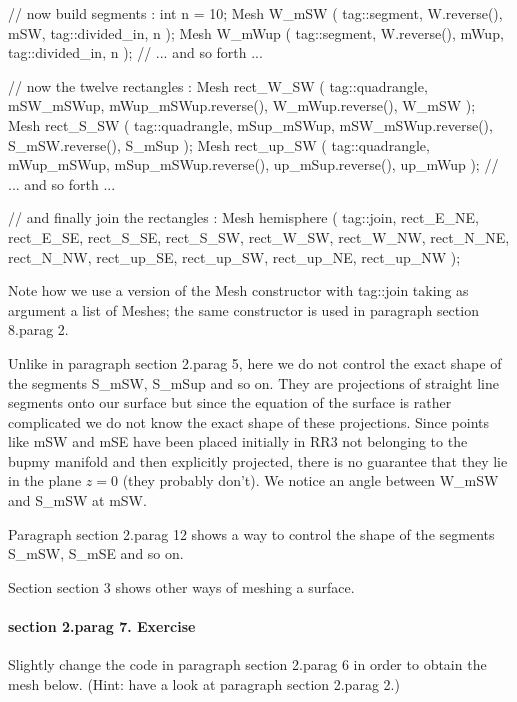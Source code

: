 \verbatim
   // now build segments :
   int n = 10;
   Mesh W_mSW  ( tag::segment, W.reverse(), mSW,  tag::divided_in, n );
   Mesh W_mWup ( tag::segment, W.reverse(), mWup, tag::divided_in, n );
   // ... and so forth ...

   // now the twelve rectangles :
   Mesh rect_W_SW  ( tag::quadrangle,
      mSW_mSWup, mWup_mSWup.reverse(), W_mWup.reverse(), W_mSW );
   Mesh rect_S_SW  ( tag::quadrangle,
      mSup_mSWup, mSW_mSWup.reverse(), S_mSW.reverse(), S_mSup );
   Mesh rect_up_SW ( tag::quadrangle,
      mWup_mSWup, mSup_mSWup.reverse(), up_mSup.reverse(), up_mWup );
   // ... and so forth ...
\endverbatim
\vfil\eject

\verbatim
   // and finally join the rectangles :
   Mesh hemisphere ( tag::join,
      { rect_E_NE, rect_E_SE, rect_S_SE, rect_S_SW, rect_W_SW, rect_W_NW,
        rect_N_NE, rect_N_NW, rect_up_SE, rect_up_SW, rect_up_NE, rect_up_NW } );
\endverbatim

Note how we use a version of the {\codett Mesh} constructor with {\codett tag::join} taking as
argument a list of {\codett Mesh}es; the same constructor is used in paragraph \numb section
8.\numb parag 2.

Unlike in paragraph \numb section 2.\numb parag 5, here we do not control the
exact shape of the segments {\codett S\_mSW}, {\codett S\_mSup} and so on.
They are projections of straight line segments onto our surface but since the equation
of the surface is rather complicated we do not know the exact shape of these projections.
Since points like {\codett mSW} and {\codett mSE} have been placed initially in {\codett RR3}
not belonging to the {\codett bupmy} manifold and then explicitly {\codett project}ed,
there is no guarantee that they lie in the plane $ z = 0 $ (they probably don't).
We notice an angle between {\codett W\_mSW} and {\codett S\_mSW} at {\codett mSW}.

Paragraph \numb section 2.\numb parag 12 shows a way to control the shape of the segments
{\codett S\_mSW}, {\codett S\_mSE} and so on.

Section \numb section 3 shows other ways of meshing a surface.


\paragraph{\numb section 2.\numb parag 7. Exercise}

Slightly change the code in paragraph \numb section 2.\numb parag 6
in order to obtain the mesh below.
(Hint: have a look at paragraph \numb section 2.\numb parag 2.)

